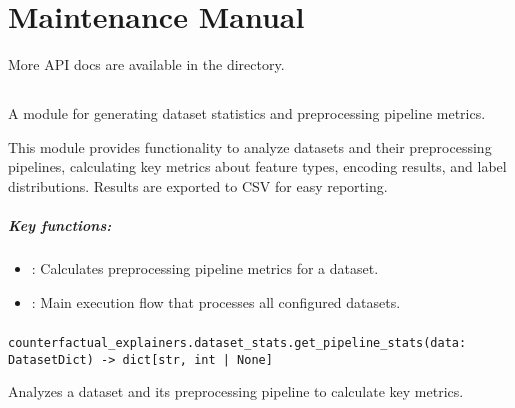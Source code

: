 \chapter{Maintenance Manual\label{chap:maintenance-manual}}

More API docs are available in the  directory.  

\section{}
\label{sec:dataset_stats}
A module for generating dataset statistics and preprocessing pipeline metrics.

This module provides functionality to analyze datasets and their preprocessing
pipelines, calculating key metrics about feature types, encoding results, and
label distributions. Results are exported to CSV for easy reporting.

\paragraph{Key functions:}
\begin{itemize}
    \item {}: Calculates preprocessing pipeline metrics for a dataset.
    \item {}: Main execution flow that processes all configured datasets.
\end{itemize}

\subsection{}
\label{func:get_pipeline_stats}

\begin{lstlisting}
counterfactual_explainers.dataset_stats.get_pipeline_stats(data: DatasetDict) -> dict[str, int | None]
\end{lstlisting}

Analyzes a dataset and its preprocessing pipeline to calculate key metrics.

